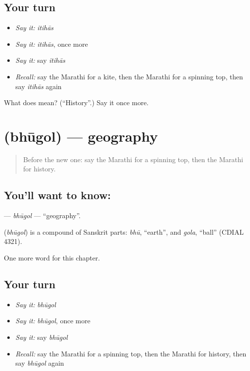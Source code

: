 \subsection*{Your turn}
\begin{itemize}
\raggedright
  \item \emph{Say it:} \emph{itihās}
  \item \emph{Say it:} \emph{itihās}, once more
  \item \emph{Say it:} say \emph{itihās}
  \item \emph{Recall:} say the Marathi for a kite, then the Marathi for a spinning top, then say \emph{itihās} again
\end{itemize}

\begin{tcolorbox}[breakable,colback=teal!4,colframe=teal!35!black,title={Before you move on}]
What does  mean? (\textquotedblleft{}History\textquotedblright{}.) Say it once more.
\end{tcolorbox}
\section[\texorpdfstring{\mr{भूगोल} (bhūgol)}{भूगोल (bhūgol)}]{ (bhūgol) — geography}

\label{lesson:MR-C250-bhugol}



\begin{quote}
Before the new one: say the Marathi for a spinning top, then the Marathi for history.
\end{quote}

\subsection*{You'll want to know: }
\textbf{} — \emph{bhūgol} — \textquotedblleft{}geography\textquotedblright{}.

\begin{cousinweb}
\textbf{} (\emph{bhūgol}) is a compound of Sanskrit parts: \emph{bhū}, \textquotedblleft{}earth\textquotedblright{}, and \emph{gola}, \textquotedblleft{}ball\textquotedblright{} (CDIAL 4321).
\end{cousinweb}

\begin{grammarlens}[title={What you've built}]
One more word for this chapter.
\end{grammarlens}

\subsection*{Your turn}
\begin{itemize}
\raggedright
  \item \emph{Say it:} \emph{bhūgol}
  \item \emph{Say it:} \emph{bhūgol}, once more
  \item \emph{Say it:} say \emph{bhūgol}
  \item \emph{Recall:} say the Marathi for a spinning top, then the Marathi for history, then say \emph{bhūgol} again
\end{itemize}

